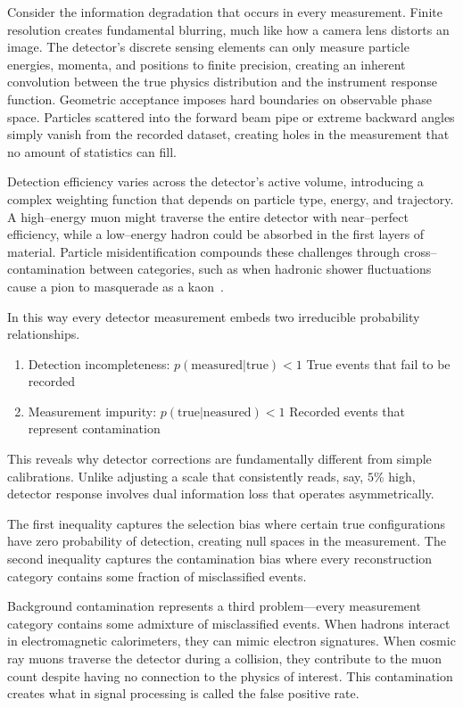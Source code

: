 \begin{definition}
    Consider the information degradation that occurs in every measurement. 
    Finite resolution creates fundamental blurring, much like how a camera lens distorts an image.
    The detector's discrete sensing elements can only measure particle energies, momenta, and positions to finite precision, creating an inherent convolution between the true physics distribution and the instrument response function.
    Geometric acceptance imposes hard boundaries on observable phase space.
    Particles scattered into the forward beam pipe or extreme backward angles simply vanish from the recorded dataset, creating holes in the measurement that no amount of statistics can fill.
    
    Detection efficiency varies across the detector's active volume, introducing a complex weighting function that depends on particle type, energy, and trajectory.
    A high--energy muon might traverse the entire detector with near--perfect efficiency, while a low--energy hadron could be absorbed in the first layers of material.
    Particle misidentification compounds these challenges through cross--contamination between categories, such as when hadronic shower fluctuations cause a pion to masquerade as a kaon~\cite{belle_collaboration_precision_2013}.

    In this way every detector measurement embeds two irreducible probability relationships.
    \begin{enumerate}
        \item Detection incompleteness: \(p(\text{measured}|\text{true}) < 1\) True events that fail to be recorded
        \item Measurement impurity: \(p(\text{true}|\text{neasured}) < 1\) Recorded events that represent contamination
    \end{enumerate}
    This reveals why detector corrections are fundamentally different from simple calibrations.
    Unlike adjusting a scale that consistently reads, say, \(5\%\) high, detector response involves dual information loss that operates asymmetrically.
    
    The first inequality captures the selection bias where certain true configurations have zero probability of detection, creating null spaces in the measurement.
    The second inequality captures the contamination bias where every reconstruction category contains some fraction of misclassified events.
    
    Background contamination represents a third problem---every measurement category contains some admixture of misclassified events.
    When hadrons interact in electromagnetic calorimeters, they can mimic electron signatures.
    When cosmic ray muons traverse the detector during a collision, they contribute to the muon count despite having no connection to the physics of interest.
    This contamination creates what in signal processing is called the false positive rate.
    

\end{definition}
